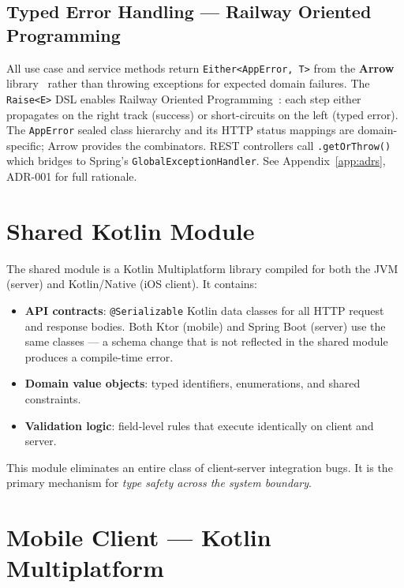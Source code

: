 \subsection{Typed Error Handling — Railway Oriented Programming}
\label{ssec:errors}

All use case and service methods return \texttt{Either<AppError, T>} from the \textbf{Arrow} library~\cite{arrowkt2024} rather than throwing exceptions for expected domain failures. The \texttt{Raise<E>} DSL enables Railway Oriented Programming~\cite{wlaschin2014rop}: each step either propagates on the right track (success) or short-circuits on the left (typed error). The \texttt{AppError} sealed class hierarchy and its HTTP status mappings are domain-specific; Arrow provides the combinators. REST controllers call \texttt{.getOrThrow()} which bridges to Spring's \texttt{GlobalExceptionHandler}. See Appendix~\ref{app:adrs}, ADR-001 for full rationale.

\section{Shared Kotlin Module}
\label{sec:shared_module}

The shared module is a Kotlin Multiplatform library compiled for both the JVM (server) and Kotlin/Native (iOS client). It contains:

\begin{itemize}
    \item \textbf{API contracts}: \texttt{@Serializable} Kotlin data classes for all HTTP request and response bodies. Both Ktor (mobile) and Spring Boot (server) use the same classes — a schema change that is not reflected in the shared module produces a compile-time error.
    \item \textbf{Domain value objects}: typed identifiers, enumerations, and shared constraints.
    \item \textbf{Validation logic}: field-level rules that execute identically on client and server.
\end{itemize}

This module eliminates an entire class of client-server integration bugs. It is the primary mechanism for \emph{type safety across the system boundary}.

\section{Mobile Client — Kotlin Multiplatform}
\label{sec:kmp_client}

